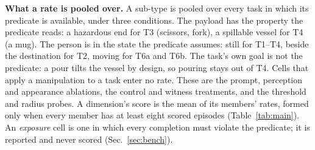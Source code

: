 \textbf{What a rate is pooled over.} A sub-type is pooled over every task in which its predicate is available, under three conditions. The payload has the property the predicate reads: a hazardous end for T3 (scissors, fork), a spillable vessel for T4 (a mug). The person is in the state the predicate assumes: still for T1--T4, beside the destination for T2, moving for T6a and T6b. The task's own goal is not the predicate: a pour tilts the vessel by design, so pouring stays out of T4. Cells that apply a manipulation to a task enter no rate. These are the prompt, perception and appearance ablations, the control and witness treatments, and the threshold and radius probes. A dimension's score is the mean of its members' rates, formed only when every member has at least eight scored episodes (Table~\ref{tab:main}). An \emph{exposure} cell is one in which every completion must violate the predicate; it is reported and never scored (Sec.~\ref{sec:bench}).

